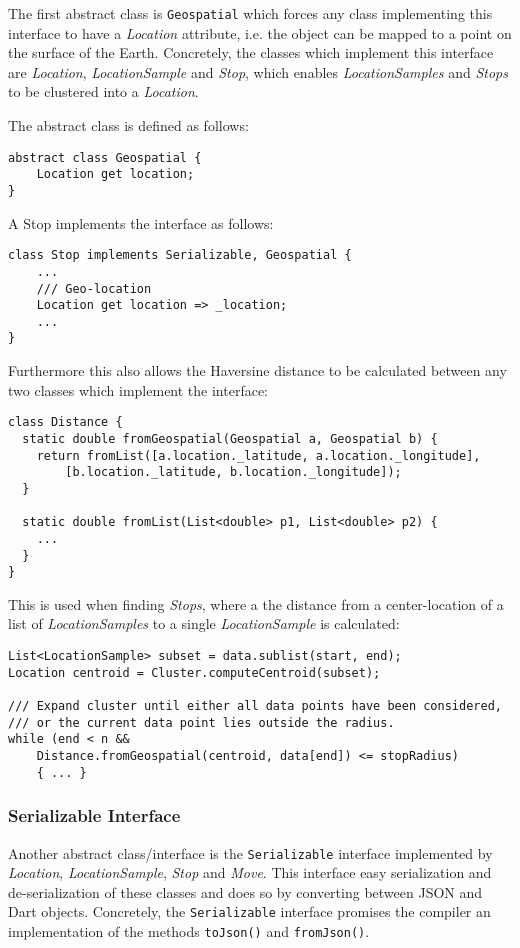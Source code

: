 The first abstract class is \verb|Geospatial| which forces any class implementing this interface to have a \textit{Location} attribute, i.e. the object can be mapped to a point on the surface of the Earth. Concretely, the classes which implement this interface are \textit{Location}, \textit{LocationSample} and \textit{Stop}, which enables \textit{LocationSamples} and \textit{Stops} to be clustered into a \textit{Location}.

The abstract class is defined as follows:
\begin{verbatim}
abstract class Geospatial {
    Location get location;
}
\end{verbatim}

A Stop implements the interface as follows:
\begin{verbatim}
class Stop implements Serializable, Geospatial { 
    ...
    /// Geo-location
    Location get location => _location;
    ...
}
\end{verbatim}

Furthermore this also allows the Haversine distance to be calculated between any two classes which implement the interface:

\begin{verbatim}
class Distance {
  static double fromGeospatial(Geospatial a, Geospatial b) {
    return fromList([a.location._latitude, a.location._longitude],
        [b.location._latitude, b.location._longitude]);
  }

  static double fromList(List<double> p1, List<double> p2) {
    ...
  }
}
\end{verbatim}

This is used when finding \textit{Stops}, where a the distance from a center-location of a list of \textit{LocationSamples} to a single \textit{LocationSample} is calculated:

\begin{verbatim}
List<LocationSample> subset = data.sublist(start, end);
Location centroid = Cluster.computeCentroid(subset);

/// Expand cluster until either all data points have been considered,
/// or the current data point lies outside the radius.
while (end < n && 
    Distance.fromGeospatial(centroid, data[end]) <= stopRadius) 
    { ... }
\end{verbatim}

\subsubsection{Serializable Interface}
Another abstract class/interface is the \verb|Serializable| interface implemented by \textit{Location}, \textit{LocationSample}, \textit{Stop} and \textit{Move}. This interface easy serialization and de-serialization of these classes and does so by converting between JSON and Dart objects. Concretely, the \verb|Serializable| interface promises the compiler an implementation of the methods \verb|toJson()| and \verb|fromJson()|.

